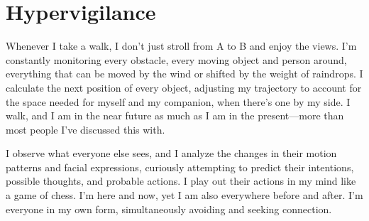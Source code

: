 
\chapter*{Hypervigilance}

Whenever I take a walk, I don't just stroll from A to B and enjoy the views. I'm constantly monitoring every obstacle, every moving object and person around, everything that can be moved by the wind or shifted by the weight of raindrops. I calculate the next position of every object, adjusting my trajectory to account for the space needed for myself and my companion, when there's one by my side. I walk, and I am in the near future as much as I am in the present—more than most people I've discussed this with.

I observe what everyone else sees, and I analyze the changes in their motion patterns and facial expressions, curiously attempting to predict their intentions, possible thoughts, and probable actions. I play out their actions in my mind like a game of chess. I'm here and now, yet I am also everywhere before and after. I'm everyone in my own form, simultaneously avoiding and seeking connection.
